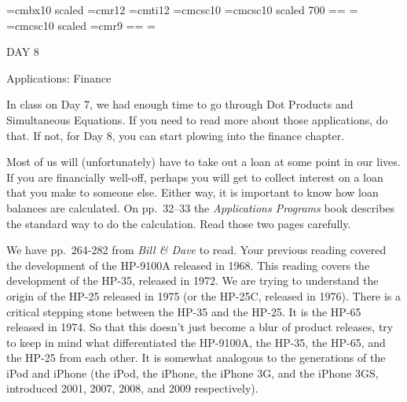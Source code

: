 
\def\folio{\ifnum\pageno>0 \number\pageno \else
   \ifnum\pageno<0 \romannumeral-\pageno \else\fi\fi}

\font\largebf=cmbx10  scaled 
\font\largerm=cmr12
\font\largeit=cmti12
\font\tensc=cmcsc10
\font\sevensc=cmcsc10 scaled 700
\newfam\scfam \def\sc{\fam\scfam\tensc}
\textfont\scfam=\tensc \scriptfont\scfam=\sevensc
\scriptscriptfont\scfam=\sevensc
\font\largesc=cmcsc10 scaled 
\font\ninerm=cmr9
\newfam\srfam \def\sr{\fam\srfam\ninerm}
\textfont\srfam=\ninerm \scriptfont\srfam=\sevenrm
\scriptscriptfont\srfam=\fiverm




\null\vskip36pt

\centerline{\largerm DAY 8}
\nobreak\bigskip

\centerline{\largeit Applications: Finance}
\nobreak\bigskip

\nobreak\bigskip

\noindent In class on Day 7, we had enough time to go through Dot Products and Simultaneous Equations. If you need to read more about those applications, do that. If not, for Day 8, you can start plowing into the finance chapter.

\bigskip

\nobreak\bigskip

\noindent Most of us will (unfortunately) have to take out a loan at some point in our lives. If you are financially well-off, perhaps you will get to collect interest on a loan that you make to someone else. Either way, it is important to know how loan balances are calculated. On pp.~32--33 the {\it Applications Programs} book describes the standard way to do the calculation. Read those two pages carefully.
\bigskip

\nobreak\bigskip

\noindent We have pp.~264-282 from {\it Bill \& Dave} to read. Your previous reading covered the development of the HP-9100A released in 1968. This reading covers the development of the HP-35, released in 1972. We are trying to understand the origin of the HP-25 released in 1975 (or the HP-25C, released in 1976). There is a critical stepping stone between the HP-35 and the HP-25. It is the HP-65 released in 1974. So that this doesn't just become a blur of product releases, try to keep in mind what differentiated the HP-9100A, the HP-35, the HP-65, and the HP-25 from each other. It is somewhat analogous to the generations of the iPod and iPhone (the iPod, the iPhone, the iPhone 3G, and the iPhone 3GS, introduced 2001, 2007, 2008, and 2009 respectively).

